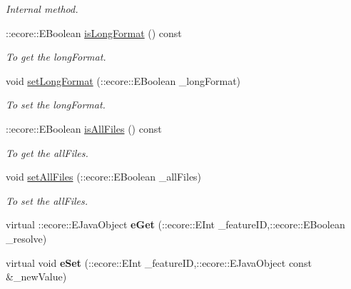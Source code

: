 \begin{DoxyCompactItemize}
\begin{DoxyCompactList}\small\item\em Internal method. \item\end{DoxyCompactList}\item 
::ecore::EBoolean \hyperlink{classFMS__Data_1_1LsDirOptions_aa77c88409a1cf4a6e8fbdf5fc13d446b}{isLongFormat} () const 
\begin{DoxyCompactList}\small\item\em To get the longFormat. \item\end{DoxyCompactList}\item 
void \hyperlink{classFMS__Data_1_1LsDirOptions_a64e6abd7835bd261d498b4b170326cea}{setLongFormat} (::ecore::EBoolean \_\-longFormat)
\begin{DoxyCompactList}\small\item\em To set the longFormat. \item\end{DoxyCompactList}\item 
::ecore::EBoolean \hyperlink{classFMS__Data_1_1LsDirOptions_a0e466ba9a876e3fe26ae599606e0a73b}{isAllFiles} () const 
\begin{DoxyCompactList}\small\item\em To get the allFiles. \item\end{DoxyCompactList}\item 
void \hyperlink{classFMS__Data_1_1LsDirOptions_a56c8a247ace0b04da43049e5c61c6b3b}{setAllFiles} (::ecore::EBoolean \_\-allFiles)
\begin{DoxyCompactList}\small\item\em To set the allFiles. \item\end{DoxyCompactList}\item 
\hypertarget{classFMS__Data_1_1LsDirOptions_a8a875fd8cd84815f77ca31a28d684db6}{
virtual ::ecore::EJavaObject {\bfseries eGet} (::ecore::EInt \_\-featureID,::ecore::EBoolean \_\-resolve)}
\label{classFMS__Data_1_1LsDirOptions_a8a875fd8cd84815f77ca31a28d684db6}

\item 
\hypertarget{classFMS__Data_1_1LsDirOptions_abbe7f1c62ef1473de9a49da896464b20}{
virtual void {\bfseries eSet} (::ecore::EInt \_\-featureID,::ecore::EJavaObject const \&\_\-newValue)}
\label{classFMS__Data_1_1LsDirOptions_abbe7f1c62ef1473de9a49da896464b20}


\end{DoxyCompactItemize}
